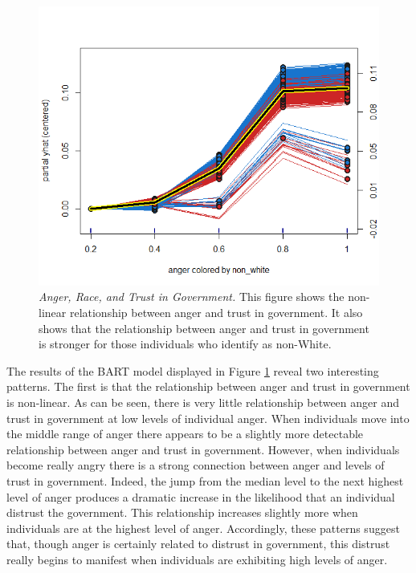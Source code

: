 \documentclass[12pt, letterpaper]{article}
\begin{document}
\begin{center}
\begin{figure}
\begin{center}
\includegraphics[width=\textwidth]{bart_model}
\caption{\footnotesize\textit{Anger, Race, and Trust in Government.} This figure shows the non-linear relationship between anger and trust in government. It also shows that the relationship between anger and trust in government is stronger for those individuals who identify as non-White.}
\label{fig:bart-results}
\end{center}
\end{figure}
\end{center}

The results of the BART model displayed in Figure \ref{fig:bart-results} reveal two interesting patterns. The first is that the relationship between anger and trust in government is non-linear. As can be seen, there is very little relationship between anger and trust in government at low levels of individual anger. When individuals move into the middle range of anger there appears to be a slightly more detectable relationship between anger and trust in government. However, when individuals become really angry there is a strong connection between anger and levels of trust in government. Indeed, the jump from the median level to the next highest level of anger produces a dramatic increase in the likelihood that an individual distrust the government. This relationship increases slightly more when individuals are at the highest level of anger. Accordingly, these patterns suggest that, though anger is certainly related to distrust in government, this distrust really begins to manifest when individuals are exhibiting high levels of anger.
\end{document}
